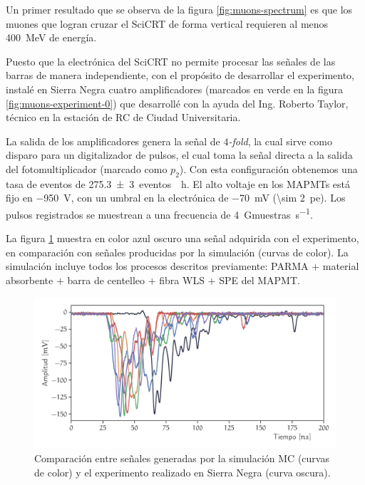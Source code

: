 Un primer resultado que se observa de la figura \ref{fig:muons-spectrum} es que los muones que logran cruzar el SciCRT de forma vertical requieren al menos \SI{400}{\mega\electronvolt} de energía.

Puesto que la electrónica del SciCRT no permite procesar las señales de las barras de manera independiente, con el propósito de desarrollar el experimento, instalé en Sierra Negra cuatro amplificadores (marcados en verde en la figura \ref{fig:muons-experiment-0}) que desarrollé con la ayuda del Ing. Roberto Taylor, técnico en la estación de RC de Ciudad Universitaria.

La salida de los amplificadores genera la señal de \emph{$4$-fold}, la cual sirve como disparo para un digitalizador de pulsos, el cual toma la señal directa a la salida del fotomultiplicador (marcado como $p_{2}$). Con esta configuración obtenemos una tasa de eventos de \SI{275.3(30)}{eventos \per\hour}. El alto voltaje en los MAPMTs está fijo en \SI{-950}{\volt}, con un umbral en la electrónica de \SI{-70}{\milli\volt} (\SI{\sim 2}{pe}). Los pulsos registrados se muestrean a una frecuencia de \SI{4}{\giga muestras\per\second}.

La figura \ref{fig:muon-pulse} muestra en color azul oscuro una señal adquirida con el experimento, en comparación con señales producidas por la simulación (curvas de color). La simulación incluye todos los procesos descritos previamente: PARMA $+$ material absorbente $+$ barra de centelleo $+$ fibra WLS $+$ SPE del MAPMT.

\begin{figure}
        \centering
        \includegraphics[width=\textwidth]{muon-pulse.pdf}
        \caption{Comparación entre señales generadas por la simulación MC (curvas de color) y el experimento realizado en Sierra Negra (curva oscura).}
        \label{fig:muon-pulse}
\end{figure}

